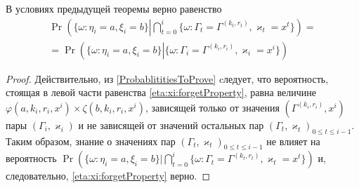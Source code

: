 \documentclass[a4paper,12pt,russian]{extarticle}
\newcommand{\ml}[1]{\begin{multline}#1\end{multline}}
\begin{document}
\begin{corollary}
В условиях предыдущей теоремы верно равенство
\ml
{
\Pr \left(\{ \omega \colon \eta_i = a, \xi_i=b\} \left|\bigcap_{t=0}^{i}\{\omega\colon \Gamma_t=\Gamma^{(k_t,r_t)}, \varkappa_t=x^t\}\right.\right)=\\
=\Pr \left(\{ \omega \colon \eta_i = a, \xi_i=b\} \left|\{\omega\colon \Gamma_i=\Gamma^{(k_i,r_i)}, \varkappa_i=x^i\}\right.\right)
\label{eta:xi:forgetProperty}
}

\label{eta:xi:forget}
\end{corollary}
\begin{proof}
Действительно, из \eqref{ProbablititiesToProve} cледует, что вероятность, стоящая в левой части равенства \eqref{eta:xi:forgetProperty}, равна величине $\varphi(a,k_i,r_i,x^i)\times \zeta(b,k_i,r_i,x^i)$, зависящей только от значения $(\Gamma^{(k_i,r_i)},x^i)$ пары $(\Gamma_i,\varkappa_i)$ и не зависящей от значений остальных пар $(\Gamma_t,\varkappa_t)_{0\leqslant t \leqslant i-1}$. Таким образом, знание о значениях пар $(\Gamma_t,\varkappa_t)_{0\leqslant t \leqslant i-1}$ не влияет на вероятность $\Pr (\{ \omega \colon \eta_i = a, \xi_i=b\} |\bigcap_{t=0}^{i}\{\omega\colon \Gamma_t=\Gamma^{(k_t,r_t)}, \varkappa_t=x^t\})$ и, следовательно, \eqref{eta:xi:forgetProperty} верно.

\end{proof}
\end{document}
